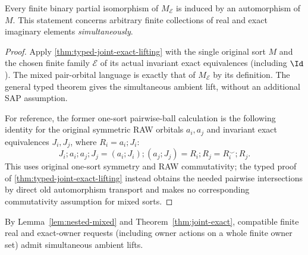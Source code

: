\begin{theorem}
\label{thm:joint-exact}
Every finite binary partial isomorphism of $M_{\mathcal E}$ is induced
by an automorphism of $M$. This statement concerns arbitrary finite
collections of real and exact imaginary elements \emph{simultaneously}.
\end{theorem}
\begin{proof}
Apply \cref{thm:typed-joint-exact-lifting} with the single original
sort $M$ and the chosen finite family $\mathcal E$ of its actual
invariant exact equivalences (including $\Id$). The mixed
pair-orbital language is exactly that of $M_{\mathcal E}$ by its
definition. The general typed theorem gives the simultaneous ambient
lift, without an additional SAP assumption.

For reference, the former one-sort pairwise-ball calculation is the
following identity for the original symmetric RAW orbitals $a_i,a_j$
and invariant exact equivalences $J_i,J_j$, where $R_i=a_i;J_i$:
\[
 J_i;a_i;a_j;J_j
       =(a_i;J_i);(a_j;J_j)
       =R_i;R_j=R_i^\smile;R_j.
 \tag{JE-PB}\label{eq:joint-exact-pairwise-balls}
\]
This uses original one-sort symmetry and RAW commutativity; the typed
proof of \cref{thm:typed-joint-exact-lifting} instead obtains the needed
pairwise intersections by direct old automorphism transport and makes
no corresponding commutativity assumption for mixed sorts.
\end{proof}

By Lemma~\ref{lem:nested-mixed} and
Theorem~\ref{thm:joint-exact}, compatible finite real and
exact-owner requests (including owner actions on a whole finite owner
set) admit simultaneous ambient lifts.

